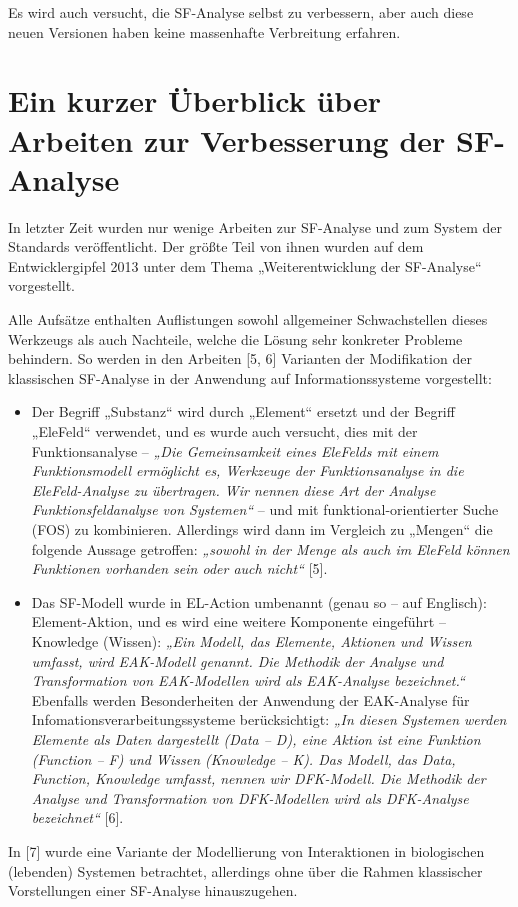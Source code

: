 \documentclass[11pt,a4paper]{article}
\begin{document}
Es wird auch versucht, die SF-Analyse selbst zu verbessern, aber auch diese
neuen Versionen haben keine massenhafte Verbreitung erfahren.

\section*{Ein kurzer Überblick über Arbeiten zur Verbesserung der SF-Analyse} 

In letzter Zeit wurden nur wenige Arbeiten zur SF-Analyse und zum System der
Standards veröffentlicht. Der größte Teil von ihnen wurden auf dem
Entwicklergipfel 2013 unter dem Thema „Weiterentwicklung der SF-Analyse“
vorgestellt.

Alle Aufsätze enthalten Auflistungen sowohl allgemeiner Schwachstellen dieses
Werkzeugs als auch Nachteile, welche die Lösung sehr konkreter Probleme
behindern.  So werden in den Arbeiten [5, 6] Varianten der Modifikation der
klassischen SF-Analyse in der Anwendung auf Informationssysteme vorgestellt:
\begin{itemize}
\item Der Begriff „Substanz“ wird durch „Element“ ersetzt und der Begriff
  „EleFeld“ verwendet, und es wurde auch versucht, dies mit der
  Funktionsanalyse -- \emph{„Die Gemeinsamkeit eines EleFelds mit einem
    Funktionsmodell ermöglicht es, Werkzeuge der Funktionsanalyse in die
    EleFeld-Analyse zu übertragen. Wir nennen diese Art der Analyse
    Funktionsfeldanalyse von Systemen“} -- und mit funktional-orientierter
  Suche (FOS) zu kombinieren.  Allerdings wird dann im Vergleich zu „Mengen“
  die folgende Aussage getroffen: \emph{„sowohl in der Menge als auch im
    EleFeld können Funktionen vorhanden sein oder auch nicht“} [5].
\item Das SF-Modell wurde in EL-Action umbenannt (genau so -- auf Englisch):
  Element-Aktion, und es wird eine weitere Komponente eingeführt -- Knowledge
  (Wissen): \emph{„Ein Modell, das Elemente, Aktionen und Wissen umfasst, wird
    EAK-Modell genannt.  Die Methodik der Analyse und Transformation von
    EAK-Modellen wird als EAK-Analyse bezeichnet.“} Ebenfalls werden
  Besonderheiten der Anwendung der EAK-Analyse für
  Infomationsverarbeitungssysteme berücksichtigt: \emph{„In diesen Systemen
    werden Elemente als Daten dargestellt (Data -- D), eine Aktion ist eine
    Funktion (Function -- F) und Wissen (Knowledge -- K). Das Modell, das
    Data, Function, Knowledge umfasst, nennen wir DFK-Modell.  Die Methodik
    der Analyse und Transformation von DFK-Modellen wird als DFK-Analyse
    bezeichnet“} [6].
\end{itemize}
In [7] wurde eine Variante der Modellierung von Interaktionen in biologischen
(lebenden) Systemen betrachtet, allerdings ohne über die Rahmen klassischer
Vorstellungen einer SF-Analyse hinauszugehen.
\end{document}
